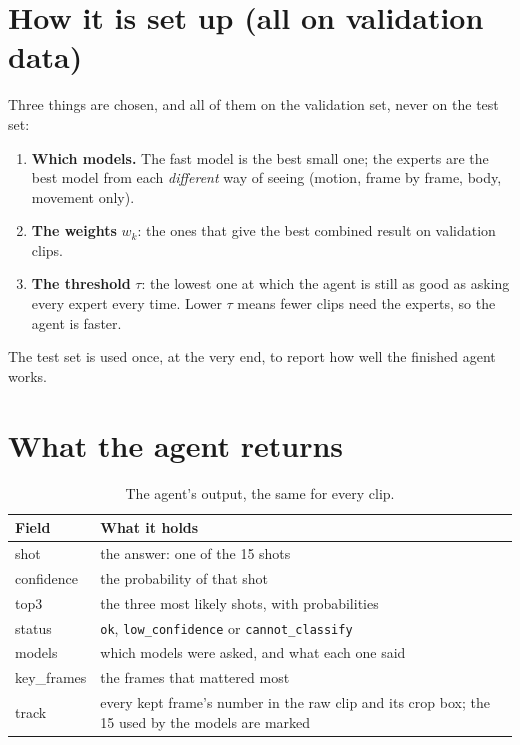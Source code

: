 \documentclass[11pt,a4paper]{article}
\begin{document}
\section{How it is set up (all on validation data)}

Three things are chosen, and all of them on the validation set, never on
the test set:
\begin{enumerate}[nosep, leftmargin=1.6em]
  \item \textbf{Which models.} The fast model is the best small one; the
        experts are the best model from each \emph{different} way of
        seeing (motion, frame by frame, body, movement only).
  \item \textbf{The weights} $w_k$: the ones that give the best combined
        result on validation clips.
  \item \textbf{The threshold} $\tau$: the lowest one at which the agent
        is still as good as asking every expert every time. Lower $\tau$
        means fewer clips need the experts, so the agent is faster.
\end{enumerate}
The test set is used once, at the very end, to report how well the
finished agent works.

\section{What the agent returns}

\begin{table}[H]
\centering
\small
\begin{tabular}{>{\ttfamily}l p{11cm}}
\toprule
\normalfont\textbf{Field} & \textbf{What it holds} \\
\midrule
shot        & the answer: one of the 15 shots \\
confidence  & the probability of that shot \\
top3        & the three most likely shots, with probabilities \\
status      & \texttt{ok}, \texttt{low\_confidence} or \texttt{cannot\_classify} \\
models      & which models were asked, and what each one said \\
key\_frames & the frames that mattered most \\
track       & every kept frame's number in the raw clip and its crop box;
              the 15 used by the models are marked \\
\bottomrule
\end{tabular}
\caption{The agent's output, the same for every clip.}
\end{table}
\end{document}
